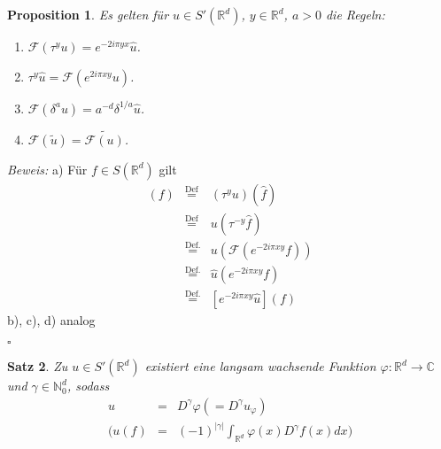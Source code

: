 \documentclass[11pt,a4paper,titlepage, ngerman]{scrartcl}
\newtheorem{Satz}{Satz}[section]
\newtheorem{Prop}[Satz]{Proposition}
\numberwithin{equation}{section}
\newcommand{\C}{\mathbb{C}} %
\newcommand{\R}{\mathbb{R}} %
\newcommand{\N}{\mathbb{N}} %
\newcommand{\f}{\hat{f}}
\newcommand{\F}{\mathcal{F}}
\newcommand{\Bew}{\emph{Beweis: }}
\newcommand{\qed}{\begin{flushright}
		$\square$
	\end{flushright}}
\begin{document}
	\begin{Prop}
		Es gelten für $u\in S'(\R^d)$, $y\in \R^d$, $a>0$ die Regeln:
		\begin{enumerate}
			\item[a)] $\F(\tau^y u) = e^{-2i\pi y x} \hat{u}$.
			\item[b)] $\tau^y \hat u =\F(e^{2i\pi x y} u)$.
			\item[c)] $\F(\delta^a u) = a^{-d}\delta^{1/a} \hat u$.
			\item[d)] $\F(\tilde{u}) = \widetilde{\F(u)}$.
		\end{enumerate}
	\end{Prop}
	
	\Bew a) Für $f\in S(\R^d)$ gilt
	\begin{eqnarray}
		[F(\tau^y u)](f) &\overset{\text{Def}}{=}& (\tau^y u)(\f)\nonumber\\
		&\overset{\text{Def}}{=}& u(\tau^{-y}\f)\nonumber\\
		&\overset{\text{Def.}}{=}& u(\F(e^{-2i\pi xy}f))\nonumber\\
		&\overset{\text{Def.}}{=}& \hat u (e^{-2i\pi xy}f)\nonumber\\
		&\overset{\text{Def.}}{=}& [e^{-2i\pi xy}\hat u](f)\nonumber
	\end{eqnarray}
	b), c), d) analog
	\qed
	
	\begin{Satz}
		Zu $u\in S'(\R^d)$ existiert eine langsam wachsende Funktion $\varphi:\R^d\rightarrow \C$ und $\gamma\in \N_0^d$, sodass
		\begin{eqnarray}
			u &=& D^\gamma\varphi (= D^\gamma u_\varphi)\nonumber\\
			( u(f) &=& (-1)^{|\gamma|}\int_{\R^d}\varphi(x) D^{\gamma} f(x)dx ) \nonumber
		\end{eqnarray}
	\end{Satz}
	
\end{document}
